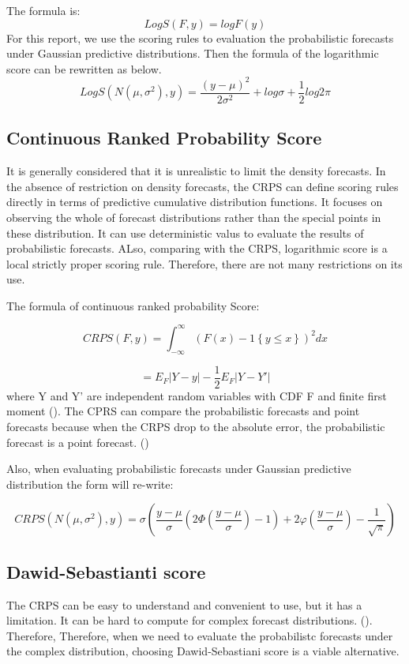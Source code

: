 \documentclass{monashthesis}
\theoremstyle{definition}
\theoremstyle{definition}
\theoremstyle{definition}
\theoremstyle{remark}
\begin{document}
The formula is: \[
      LogS(F,y)=logF(y)
  \] For this report, we use the scoring rules to evaluation the
probabilistic forecasts under Gaussian predictive distributions. Then
the formula of the logarithmic score can be rewritten as below. \[
      LogS(N(\mu,\sigma^2),y)=\frac{(y-\mu)^2}{2\sigma^2}+log\sigma+\frac{1}{2}log2\pi
  \]

\subsection{Continuous Ranked Probability
Score}\label{continuous-ranked-probability-score}

It is generally considered that it is unrealistic to limit the density
forecasts. In the absence of restriction on density forecasts, the CRPS
can define scoring rules directly in terms of predictive cumulative
distribution functions. It focuses on observing the whole of forecast
distributions rather than the special points in these distribution. It
can use deterministic valus to evaluate the results of probabilistic
forecasts. ALso, comparing with the CRPS, logarithmic score is a local
strictly proper scoring rule. Therefore, there are not many restrictions
on its use.

The formula of continuous ranked probability Score:

\[
       CRPS(F,y)=\int_{-\infty}^{\infty}(F(x)-1\left\{y\leq{x}\right\})^2 dx
   \]

\[
    = E_F|Y-y|-\frac{1}{2}E_F|Y-Y'|
  \] where Y and Y' are independent random variables with CDF F and
finite first moment (\textcite{GR07}). The CPRS can compare the
probabilistic forecasts and point forecasts because when the CRPS drop
to the absolute error, the probabilistic forecast is a point forecast.
(\textcite{GK14})

Also, when evaluating probabilistic forecasts under Gaussian predictive
distribution the form will re-write:

\[
       CRPS(N(\mu,\sigma^2),y)=\sigma\left(\frac{y-\mu}{\sigma}\left(2\Phi\left(\frac{y-\mu}{\sigma}\right)-1\right)+2\varphi\left(\frac{y-\mu}{\sigma}\right)-\frac{1}{\sqrt{\pi}}\right)
  \]

\subsection{Dawid-Sebastianti score}\label{dawid-sebastianti-score}

The CRPS can be easy to understand and convenient to use, but it has a
limitation. It can be hard to compute for complex forecast
distributions. (\textcite{GK14}). Therefore, Therefore, when we need to
evaluate the probabilistc forecasts under the complex distribution,
choosing Dawid-Sebastiani score is a viable alternative.
\end{document}
